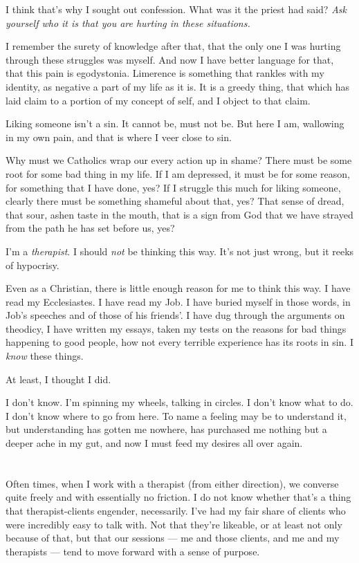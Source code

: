 I think that's why I sought out confession. What was it the priest had said? \emph{Ask yourself who it is that you are hurting in these situations.}

I remember the surety of knowledge after that, that the only one I was hurting through these struggles was myself. And now I have better language for that, that this pain is egodystonia. Limerence is something that rankles with my identity, as negative a part of my life as it is. It is a greedy thing, that which has laid claim to a portion of my concept of self, and I object to that claim.

Liking someone isn't a sin. It cannot be, must not be. But here I am, wallowing in my own pain, and that is where I veer close to sin.

Why must we Catholics wrap our every action up in shame? There must be some root for some bad thing in my life. If I am depressed, it must be for some reason, for something that I have done, yes? If I struggle this much for liking someone, clearly there must be something shameful about that, yes? That sense of dread, that sour, ashen taste in the mouth, that is a sign from God that we have strayed from the path he has set before us, yes?

I'm a \emph{therapist}. I should \emph{not} be thinking this way. It's not just wrong, but it reeks of hypocrisy.

Even as a Christian, there is little enough reason for me to think this way. I have read my Ecclesiastes. I have read my Job. I have buried myself in those words, in Job's speeches and of those of his friends'. I have dug through the arguments on theodicy, I have written my essays, taken my tests on the reasons for bad things happening to good people, how not every terrible experience has its roots in sin. I \emph{know} these things.

At least, I thought I did.

I don't know. I'm spinning my wheels, talking in circles. I don't know what to do. I don't know where to go from here. To name a feeling may be to understand it, but understanding has gotten me nowhere, has purchased me nothing but a deeper ache in my gut, and now I must feed my desires all over again.

\section{}

Often times, when I work with a therapist (from either direction), we converse quite freely and with essentially no friction. I do not know whether that's a thing that therapist-clients engender, necessarily. I've had my fair share of clients who were incredibly easy to talk with. Not that they're likeable, or at least not only because of that, but that our sessions --- me and those clients, and me and my therapists --- tend to move forward with a sense of purpose.

